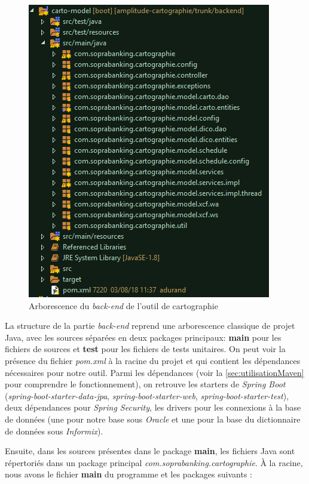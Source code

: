 \documentclass{polytech/polytech}
\begin{document}
\begin{figure}
	\includegraphics[scale=1]{images/arboBackEnd}
	\caption{Arborescence du \textit{back-end} de l'outil de cartographie}
	\label{fig:arboBackEnd}
\end{figure}

La structure de la partie \textit{back-end} reprend une arborescence classique de projet Java, avec les sources séparées en deux packages principaux: \textbf{main} pour les fichiers de sources et \textbf{test} pour les fichiers de tests unitaires. On peut voir la présence du fichier \textit{pom.xml} à la racine du projet et qui contient les dépendances nécessaires pour notre outil. Parmi les dépendances (voir la \autoref{sec:utilisationMaven} pour comprendre le fonctionnement), on retrouve les starters de \textit{Spring Boot} (\textit{spring-boot-starter-data-jpa}, \textit{spring-boot-starter-web}, \textit{spring-boot-starter-test}), deux dépendances pour \textit{Spring Security}, les drivers pour les connexions à la base de données (une pour notre base sous \textit{Oracle} et une pour la base du dictionnaire de données sous \textit{Informix}).

Ensuite, dans les sources présentes dans le package \textbf{main}, les fichiers Java sont répertoriés dans un package principal \textit{com.soprabanking.cartographie}. À la racine, nous avons le fichier \textbf{main} du programme et les packages suivants : 
\end{document}
